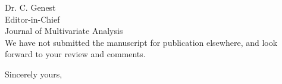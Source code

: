 \documentclass[11pt]{letter} %
\begin{document}
\begin{letter}{Dr. C. Genest \\
Editor-in-Chief  \\
Journal of Multivariate Analysis \\
}
We have not submitted the manuscript for publication elsewhere, and look forward to  your review and comments.

\closing{Sincerely yours,}




\end{letter}
\end{document}
